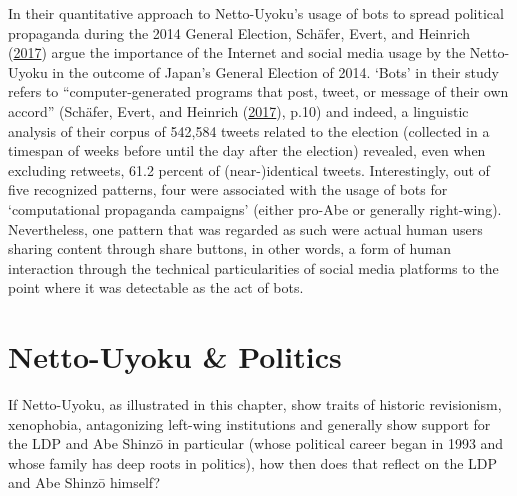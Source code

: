 \documentclass[10pt,british,A4paper,twoside]{memoir}
\begin{document}
In their quantitative approach to Netto-Uyoku's usage of bots to spread
political propaganda during the 2014 General Election, Schäfer, Evert,
and Heinrich (\protect\hyperlink{ref-schafer_japans_2017}{2017}) argue
the importance of the Internet and social media usage by the Netto-Uyoku
in the outcome of Japan's General Election of 2014. `Bots' in their
study refers to ``computer-generated programs that post, tweet, or
message of their own accord'' (Schäfer, Evert, and Heinrich
(\protect\hyperlink{ref-schafer_japans_2017}{2017}), p.10) and indeed, a
linguistic analysis of their corpus of 542,584 tweets related to the
election (collected in a timespan of weeks before until the day after
the election) revealed, even when excluding retweets, 61.2 percent of
(near-)identical tweets. Interestingly, out of five recognized patterns,
four were associated with the usage of bots for `computational
propaganda campaigns' (either pro-Abe or generally right-wing).
Nevertheless, one pattern that was regarded as such were actual human
users sharing content through share buttons, in other words, a form of
human interaction through the technical particularities of social media
platforms to the point where it was detectable as the act of bots.

\section{Netto-Uyoku \& Politics}\label{netto-uyoku-politics}

If Netto-Uyoku, as illustrated in this chapter, show traits of historic
revisionism, xenophobia, antagonizing left-wing institutions and
generally show support for the LDP and Abe Shinzō in particular (whose
political career began in 1993 and whose family has deep roots in
politics), how then does that reflect on the LDP and Abe Shinzō himself?
\end{document}
